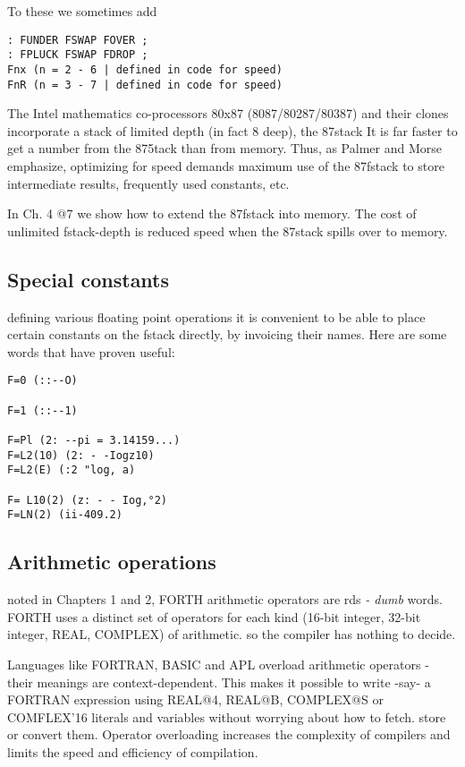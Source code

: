 To these we sometimes add

\begin{verbatim}
: FUNDER FSWAP FOVER ;
: FPLUCK FSWAP FDROP ;
Fnx (n = 2 - 6 | defined in code for speed)
FnR (n = 3 - 7 | defined in code for speed)
\end{verbatim}

The Intel mathematics co-processors 80x87 (8087/80287/80387)
and their clones incorporate a stack of limited depth (in fact 8
deep), the 87stack It is far faster to get a number from the 875tack
than from memory. Thus, as Palmer and Morse emphasize,
optimizing for speed demands maximum use of the 87fstack to store intermediate
results, frequently used constants, etc.

In Ch. 4 @7 we show how to extend the 87fstack into memory. The
cost of unlimited fstack-depth is reduced speed when the 87stack
spills over to memory.

\subsection{Special constants}
defining various floating point operations it is convenient to be
able to place certain constants on the fstack directly, by invoicing
their names. Here are some words that have proven useful:
\begin{verbatim}
F=0 (::--O)

F=1 (::--1)

F=Pl (2: --pi = 3.14159...)
F=L2(10) (2: - -Iogz10)
F=L2(E) (:2 "log, a)

F= L10(2) (z: - - Iog,°2)
F=LN(2) (ii-409.2)
\end{verbatim}
 
\subsection{Arithmetic operations}
noted in Chapters 1 and 2, FORTH arithmetic operators are
rds \textit{- dumb} words. FORTH uses a distinct set of operators
for each kind (16-bit integer, 32-bit integer, REAL, COMPLEX)
of arithmetic. so the compiler has nothing to decide.

Languages like FORTRAN, BASIC and APL overload arithmetic operators - their
meanings are context-dependent. This
makes it possible to write -say- a FORTRAN expression using
REAL@4, REAL@B, COMPLEX@S or COMFLEX’16 literals
and variables without worrying about how to fetch. store or
convert them. Operator overloading increases the complexity of
compilers and limits the speed and efficiency of compilation.

